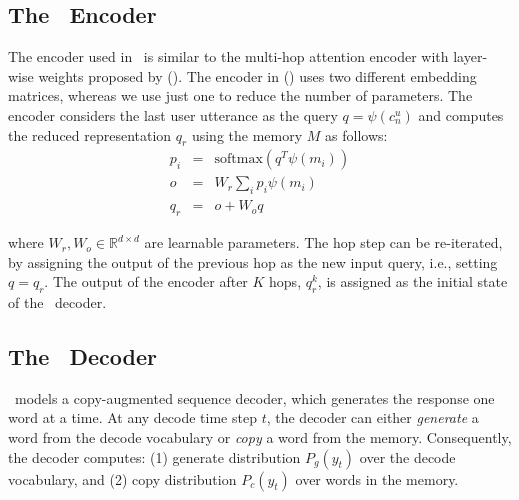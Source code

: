 
\subsection{The \sys\ Encoder}
\label{ssec:encoder}

The encoder used in \sys\ is similar to the multi-hop attention encoder with layer-wise weights proposed by \citeauthor{sukhbaatar2015end} (\citeyear{sukhbaatar2015end}). The encoder in \citeauthor{sukhbaatar2015end} (\citeyear{sukhbaatar2015end}) uses two different embedding matrices, whereas we use just one to reduce the number of parameters. The encoder considers the last user utterance as the query $q=\psi(c_n^u)$ and computes the reduced representation $q_r$ using the memory $M$ as follows:
\begin{eqnarray}
p_i &=& \text{softmax}(q^T \psi(m_i)) \\
o &=& W_r \sum\nolimits_i p_i \psi(m_i) \\
q_r &=& o + W_o  q
\end{eqnarray}

where $W_r, W_o \in \mathbb{R}^{d \times d}$ are learnable parameters. The hop step can be re-iterated, by assigning the output of the previous hop as the new input query, i.e., setting $q=q_r$. The output of the encoder after $K$ hops, $q_r^k$, is assigned as the initial state of the \sys\ decoder.

\subsection{The \sys\ Decoder}
\label{ssec:decoder}

\sys\ models a copy-augmented sequence decoder, which generates the response one word at a time. At any decode time step $t$, the decoder can either \emph{generate} a word from the decode vocabulary or \emph{copy} a word from the memory. Consequently, the decoder computes: (1) generate distribution $P_g(y_t)$ over the decode vocabulary, and (2) copy distribution $P_c(y_t)$ over words in the memory. 

